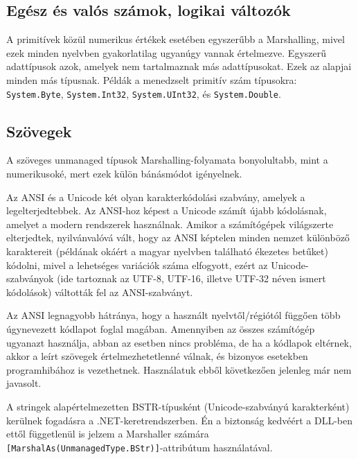 \documentclass[tocnopagenum]{thesis-ekf}
\begin{document}
	\subsection{Egész és valós számok, logikai változók}
	A primitívek közül numerikus értékek esetében egyszerűbb a Marshalling, mivel ezek minden nyelvben gyakorlatilag ugyanúgy vannak értelmezve.	Egyszerű adattípusok azok, amelyek nem tartalmaznak más adattípusokat. Ezek az alapjai minden más típusnak. Példák a menedzselt primitív szám típusokra: \verb*|System.Byte|, \verb*|System.Int32|, \verb*|System.UInt32|, és \verb*|System.Double|.
	\cite{marsh}
	\subsection{Szövegek}
	A szöveges unmanaged típusok Marshalling-folyamata bonyolultabb, mint a numerikusoké, mert ezek külön bánásmódot igényelnek.
	
	Az ANSI és a Unicode két olyan karakterkódolási szabvány, amelyek a legelterjedtebbek. Az ANSI-hoz képest a Unicode számít újabb kódolásnak, amelyet a modern rendszerek használnak. Amikor a számítógépek világszerte elterjedtek, nyilvánvalóvá vált, hogy az ANSI képtelen minden nemzet különböző karaktereit (példának okáért a magyar nyelvben található ékezetes betűket) kódolni, mivel a lehetséges variációk száma elfogyott, ezért az Unicode-szabványok (ide tartoznak az UTF-8, UTF-16, illetve UTF-32 néven ismert kódolások) váltották fel az ANSI-szabványt.
	
	Az ANSI legnagyobb hátránya, hogy a használt nyelvtől/régiótól függően több úgynevezett kódlapot foglal magában. Amennyiben az összes számítógép ugyanazt használja, abban az esetben nincs probléma, de ha a kódlapok eltérnek, akkor a leírt szövegek értelmezhetetlenné válnak, és bizonyos esetekben programhibához is vezethetnek. Használatuk ebből következően jelenleg már nem javasolt. \cite{ansi_unicode}
	
	A stringek alapértelmezetten BSTR-típusként (Unicode-szabványú karakterként) kerülnek fogadásra a .NET-keretrendszerben. Én a biztonság kedvéért a DLL-ben ettől függetlenül is jelzem a Marshaller számára \verb*|[MarshalAs(UnmanagedType.BStr)]|-attribútum használatával.
	
\end{document}
